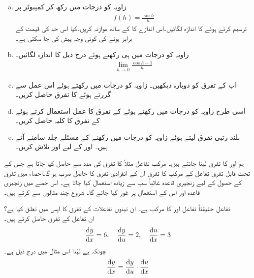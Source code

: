 \begin{enumerate}[a.]

\item
زاویہ کو درجات میں رکھ کر کمپیوٹر پر
\begin{align*}
f(h)=\frac{\sin h}{h}
\end{align*}
ترسیم کرتے ہوئے  کا اندازہ لگائیں۔اس اندازے کا  کے ساتھ موازنہ کریں۔کیا اس حد کی قیمت  کے برابر ہونے کی کوئی وجہ پیش کی جا سکتی ہے۔
\item
زاویہ کو درجات میں ہی رکھتے ہوئے درج ذیل کا اندازہ لگائیں۔
\begin{align*}
\lim_{h\to 0} \frac{\cos h-1}{h}
\end{align*}
\item
اب  کے تفرق کو دوبارہ دیکھیں۔ زاویہ کو درجات میں رکھتے ہوئے اس عمل سے گزرتے ہوئے  کا تفرق حاصل کریں۔
\item
اسی طرح زاویہ کو درجات میں رکھتے ہوئے  کے تفرق کا عمل استعمال کرتے ہوئے  کے تفرق کا کلیہ حاصل کریں۔
\item
بلند رتبی تفرق لیتے ہوئے زاویہ کو درجات میں رکھنے کے مسئلے جلد سامنے آتے ہیں۔ اور  کے لیے  اور  تلاش کریں۔
\end{enumerate}


ہم  اور  کا تفرق لینا جانتے ہیں۔ مرکب تفاعل مثلاً  کا تفرق  کی مدد سے حاصل کیا جاتا ہے جس کے تحت قابل تفرق تفاعل کے مرکب کا تفرق ان کے انفرادی تفرق کا حاصل ضرب ہو گا۔احصاء  میں تفرق کے حصول کے لیے  زنجیری قاعدہ  غالباً سب سے زیادہ استعمال کیا جاتا ہے۔ اس حصے میں زنجیری قاعدہ اور اس کے استعمال پر غور کیا جائے گا۔ شروع چند مثالوں سے کرتے ہیں۔

تفاعل  حقیقتاً تفاعل  اور  کا مرکب ہے۔ ان تینوں تفاعلات کے تفرق کا آپس میں تعلق کیا ہے؟\\
ان تفاعل کے تفرق حاصل کرتے ہیں۔
\begin{align*}
\frac{\dif y}{\dif x}=6,\quad \frac{\dif y}{\dif u}=2,\quad \frac{\dif u}{\dif x}=3
\end{align*}
چونکہ  ہے لہٰذا اس مثال میں درج ذیل ہے۔
\begin{align*}
\frac{\dif y}{\dif x}=\frac{\dif y}{\dif u}\cdot \frac{\dif u}{\dif x}
\end{align*}

